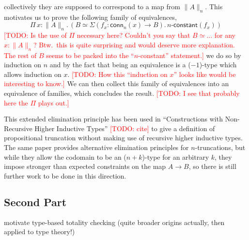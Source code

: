 \documentclass{book}
\newcommand{\TODO}[1]{\textcolor{red}{[TODO: #1]}}
\newcommand{\tr}[2]{\| #2 \|_{#1}}
\newcommand{\conn}{\mathsf{conn}}
\newcommand{\sd}{.\,}
\begin{document}
collectively they are supposed to correspond to a map from
$\tr{n}{A}$. This motivates us to prove the following family of equivalences,
\[
\Pi\,x : \tr{n}{A}\sd (B \simeq \Sigma (f_x : \conn_n(x) \to B)\sd\textsf{$n$-constant}(f_x))
\]
\TODO{Is the use of $\Pi$ necessary here?  Couldn't you say that $B
  \simeq ...$ for any $x : \tr n A$?  Btw.\ this is quite surprising
  and would deserve more explanation.  The rest of $B$ seems to be
  packed into the ``$n$-constant'' statement.}
we do so by induction on $n$ and by the fact that being an equivalence is a
($-1$)-type which allows induction on $x$. \TODO{How this ``induction
  on $x$'' looks like would be interesting to know.}
We can then collect this
family of equivalences into an equivalence of families, which
concludes the result.
\TODO{I see that probably here the $\Pi$ plays out.}

This extended elimination principle has been used in ``Constructions
with Non-Recursive Higher Inductive Types'' \TODO{cite} to give a
definition of propositional truncation without making use of recursive
higher inductive types. The same paper provides alternative
elimination principles for $n$-truncations, but while they allow the
codomain to be an ($n{+}k$)-type for an arbitrary $k$, they impose
stronger than expected constraints on the map $A \to B$, so there is
still further work to be done in this direction.



\subsection{Second Part}

motivate type-based totality checking (quite broader origins actually, then applied to type theory!)
\end{document}
